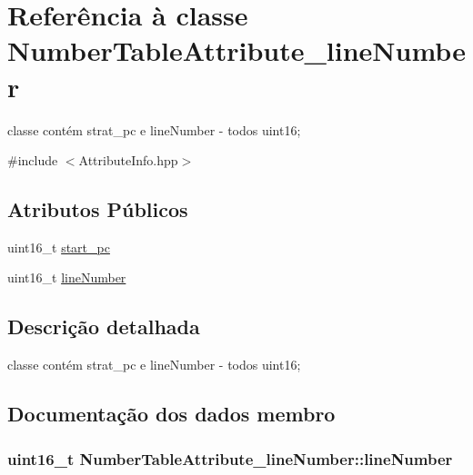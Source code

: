 \hypertarget{class_number_table_attribute__line_number}{}\section{Referência à classe Number\+Table\+Attribute\+\_\+line\+Number}
\label{class_number_table_attribute__line_number}


classe contém strat\+\_\+pc e line\+Number -\/ todos uint16;  




{\ttfamily \#include $<$Attribute\+Info.\+hpp$>$}

\subsection*{Atributos Públicos}
\begin{DoxyCompactItemize}
\item 
uint16\+\_\+t \hyperlink{class_number_table_attribute__line_number_a2ede9887ca805349c8edc876dbc4d0da}{start\+\_\+pc}
\item 
uint16\+\_\+t \hyperlink{class_number_table_attribute__line_number_a25365848043a067fce30ee31cbfe318e}{line\+Number}
\end{DoxyCompactItemize}


\subsection{Descrição detalhada}
classe contém strat\+\_\+pc e line\+Number -\/ todos uint16; 

\subsection{Documentação dos dados membro}
\subsubsection[{\texorpdfstring{line\+Number}{lineNumber}}]{\setlength{\rightskip}{0pt plus 5cm}uint16\+\_\+t Number\+Table\+Attribute\+\_\+line\+Number\+::line\+Number}\hypertarget{class_number_table_attribute__line_number_a25365848043a067fce30ee31cbfe318e}{}\label{class_number_table_attribute__line_number_a25365848043a067fce30ee31cbfe318e}
